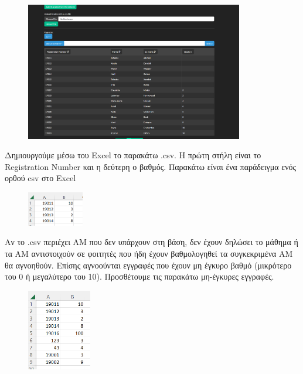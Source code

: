 \documentclass[12pt]{article}
\begin{document}
	\begin{figure}[H]
	\centering
	\includegraphics[width=0.85\textwidth]{mymy.png}
	\caption{}
	\label{fig:emptyView}
	\end{figure}

	Δημιουργούμε μέσω του Excel το παρακάτω .csv. Η πρώτη στήλη είναι το Registration Number και η δεύτερη ο βαθμός. Παρακάτω είναι ένα παράδειγμα ενός ορθού csv στο Excel
	
	\begin{figure}[H]
		\centering
		\includegraphics[width=0.22\textwidth]{correct.png}
		\caption{}
		\label{fig:emptyView}
	\end{figure}
	
	Αν το .csv περιέχει ΑΜ που δεν υπάρχουν στη βάση, δεν έχουν δηλώσει το μάθημα ή τα ΑΜ αντιστοιχούν σε φοιτητές που ήδη έχουν βαθμολογηθεί τα συγκεκριμένα ΑΜ θα αγνοηθούν. Επίσης αγνοούνται εγγραφές που έχουν μη έγκυρο βαθμό  (μικρότερο του 0 ή μεγαλύτερο του 10). Προσθέτουμε τις παρακάτω μη-έγκυρες εγγραφές.
	
	\begin{figure}[H]
		\centering
		\includegraphics[width=0.25\textwidth]{wrong.png}
		\caption{}
		\label{fig:emptyView}
	\end{figure}
	
\end{document}
